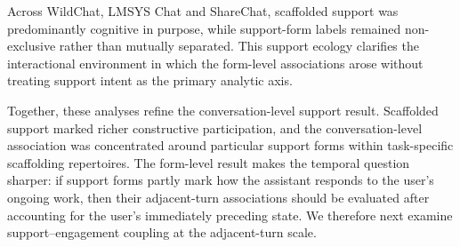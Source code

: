  Across WildChat, LMSYS Chat and ShareChat, scaffolded support was predominantly cognitive in purpose, while support-form labels remained non-exclusive rather than mutually separated. This support ecology clarifies the interactional environment in which the form-level associations arose without treating support intent as the primary analytic axis.





Together, these analyses refine the conversation-level support result. Scaffolded support marked richer constructive participation, and the conversation-level association was concentrated around particular support forms within task-specific scaffolding repertoires. The form-level result makes the temporal question sharper: if support forms partly mark how the assistant responds to the user's ongoing work, then their adjacent-turn associations should be evaluated after accounting for the user's immediately preceding state. We therefore next examine support--engagement coupling at the adjacent-turn scale.



